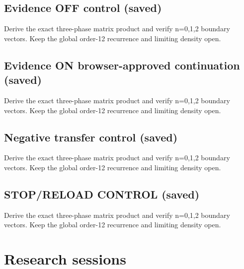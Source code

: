 \documentclass[11pt]{article}
\begin{document}
\subsection{Evidence OFF control (saved)}
Derive the exact three-phase matrix product and verify n=0,1,2 boundary vectors. Keep the global order-12 recurrence and limiting density open.\par
\subsection{Evidence ON browser-approved continuation (saved)}
Derive the exact three-phase matrix product and verify n=0,1,2 boundary vectors. Keep the global order-12 recurrence and limiting density open.\par
\subsection{Negative transfer control (saved)}
Derive the exact three-phase matrix product and verify n=0,1,2 boundary vectors. Keep the global order-12 recurrence and limiting density open.\par
\subsection{STOP/RELOAD CONTROL (saved)}
Derive the exact three-phase matrix product and verify n=0,1,2 boundary vectors. Keep the global order-12 recurrence and limiting density open.\par
\section{Research sessions}
\end{document}
